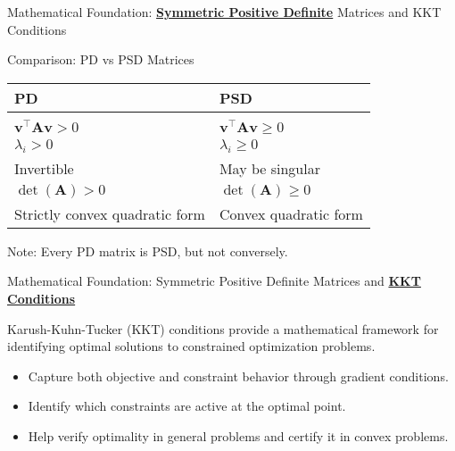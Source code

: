 \documentclass{beamer}
\begin{document}
\begin{frame}{Mathematical Foundation: \textbf{\underline{Symmetric Positive Definite}} Matrices and KKT Conditions}

\begin{alertblock}{Comparison: PD vs PSD Matrices}

\begin{tabular}{ll}
\textbf{PD} & \textbf{PSD} \\
\hline
\hfill \\
$\bm{v}^\top \bm{A} \bm{v} > 0$ & $\bm{v}^\top \bm{A} \bm{v} \geq 0$ \\
$\lambda_i > 0$ & $\lambda_i \geq 0$ \\
Invertible & May be singular \\
$\det(\bm{A}) > 0$ & $\det(\bm{A}) \geq 0$ \\
Strictly convex quadratic form & Convex quadratic form \\
\end{tabular}

\vspace{0.3cm}

Note: Every PD matrix is PSD, but not conversely.

\end{alertblock}

\end{frame}


\begin{frame}{{Mathematical Foundation: Symmetric Positive Definite Matrices and \textbf{\underline{KKT Conditions}}}}

    Karush-Kuhn-Tucker (KKT) conditions provide a mathematical framework for identifying optimal solutions to constrained optimization problems.
    
    \begin{itemize}
        \item Capture both objective and constraint behavior through gradient conditions.
        \item Identify which constraints are active at the optimal point.
        \item Help verify optimality in general problems and certify it in convex problems.
    \end{itemize}

\end{frame}
\end{document}

